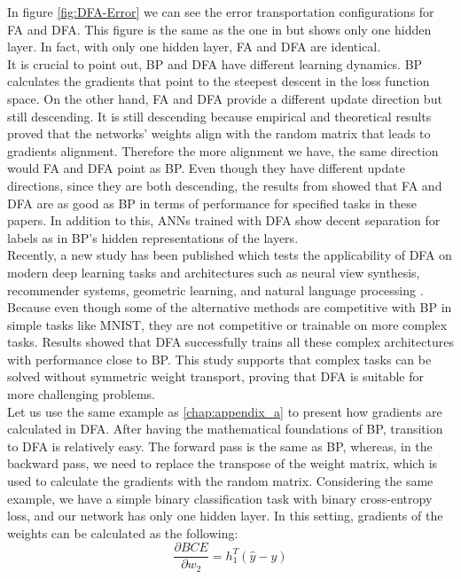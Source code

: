 \documentclass[a4paper, nobind]{templates/ociamthesis}
\begin{document}
\noindent In figure \ref{fig:DFA-Error} we can see the error transportation configurations for FA and DFA. This figure is the same as the one in \cite{nøkland2016direct} but shows only one hidden layer. In fact, with only one hidden layer, FA and DFA are identical.\\
It is crucial to point out, BP and DFA have different learning dynamics. BP calculates the gradients that point to the steepest descent in the loss function space. On the other hand, FA and DFA provide a different update direction but still descending. It is still descending because empirical and theoretical results proved that the networks' weights align with the random matrix that leads to gradients alignment. Therefore the more alignment we have, the same direction would FA and DFA point as BP. Even though they have different update directions, since they are both descending, the results from \cite{lillicrap2014random, nøkland2016direct} showed that FA and DFA are as good as BP in terms of performance for specified tasks in these papers. In addition to this, ANNs trained with DFA show decent separation for labels as in BP's hidden representations of the layers.\\
Recently, a new study has been published which tests the applicability of DFA on modern deep learning tasks and architectures such as neural view synthesis, recommender systems, geometric learning, and natural language processing \cite{launay2020direct}. Because even though some of the alternative methods are competitive with BP in simple tasks like MNIST, they are not competitive or trainable on more complex tasks. Results showed that DFA successfully trains all these complex architectures with performance close to BP. This study supports that complex tasks can be solved without symmetric weight transport, proving that DFA is suitable for more challenging problems.\\
Let us use the same example as \ref{chap:appendix_a} to present how gradients are calculated in DFA. After having the mathematical foundations of BP, transition to DFA is relatively easy. The forward pass is the same as BP, whereas, in the backward pass, we need to replace the transpose of the weight matrix, which is used to calculate the gradients with the random matrix. Considering the same example, we have a simple binary classification task with binary cross-entropy loss, and our network has only one hidden layer. In this setting, gradients of the weights can be calculated as the following:
\[
\frac{\partial BCE}{\partial w_{2}}=h_{1}^T\left(\hat{y}-y\right)
\]
\end{document}
